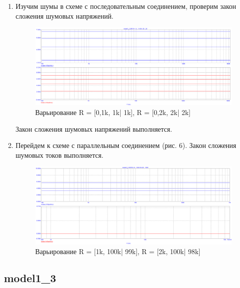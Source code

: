 \documentclass[a4paper, 12pt]{article}%
\begin{document}
\begin{enumerate}

\item

Изучим шумы в схеме с последовательным соединением, проверим закон сложения шумовых напряжений.

\begin{figure}[h!]
    \centering
    \includegraphics[scale=0.3]{images/mod1_2_1.png}
    \caption{Варьирование R = [0,1k, 1k| 1k], R = [0,2k, 2k| 2k]}
    \label{fig:1_2_1}
\end{figure}

Закон сложения шумовых напряжений выполняется.

\item
 
Перейдем к схеме с параллельным соединением (рис. 6). Закон сложения шумовых токов выполняется.

\begin{figure}[h!]
    \centering
    \includegraphics[scale=0.3]{images/mod1_2_2.png}
    \caption{Варьирование R = [1k, 100k| 99k], R = [2k, 100k| 98k]}
    \label{fig:1_2_2}
\end{figure}

\end{enumerate}

\subsection*{\textbf{model1\_3}}
\end{document}
